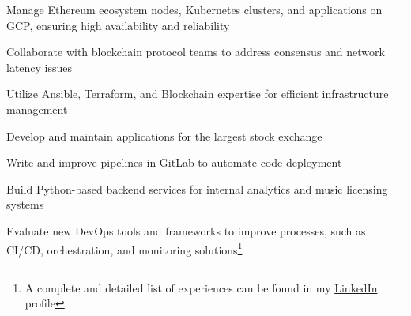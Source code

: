 \documentclass[]{willianpaixao-resume}
\begin{document}
\begin{minipage}[t]{0.64\textwidth}
\begin{tightemize}
\item Manage Ethereum ecosystem nodes, Kubernetes clusters, and applications on GCP, ensuring high availability and reliability
\item Collaborate with blockchain protocol teams to address consensus and network latency issues
\item Utilize Ansible, Terraform, and Blockchain expertise for efficient infrastructure management
\end{tightemize}
\sectionsep

\begin{tightemize}
\item Develop and maintain applications for the largest stock exchange
\item Write and improve pipelines in GitLab to automate code deployment
\end{tightemize}
\sectionsep

\begin{tightemize}
\item Build Python-based backend services for internal analytics and music licensing systems
\item Evaluate new DevOps tools and frameworks to improve processes, such as CI/CD, orchestration, and monitoring solutions\footnote{A complete and detailed list of experiences can be found in my \href{https://www.linkedin.com/in/willianpaixao/details/experience/}{LinkedIn} profile}
\end{tightemize}
\sectionsep



\end{minipage}
\end{document}
